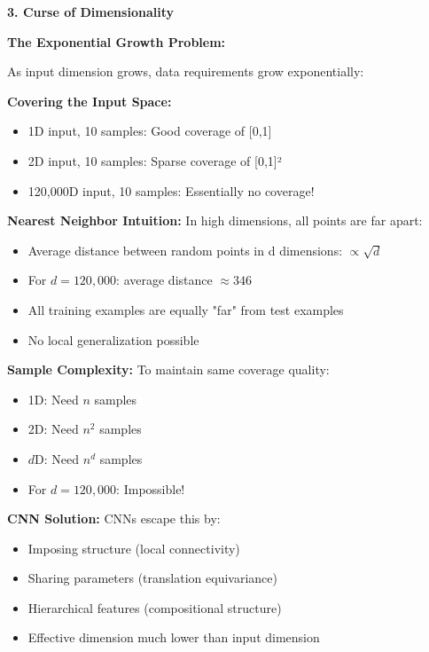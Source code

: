 \documentclass[12pt]{article}
\newcommand{\explanation}[1]{{\color{explanationcolor}#1}}
\begin{document}
\begin{enumerate}[(a)]
{    \textbf{3. Curse of Dimensionality}
    
    \explanation{
    \textbf{The Exponential Growth Problem:}
    
    As input dimension grows, data requirements grow exponentially:
    
    \textbf{Covering the Input Space:}
    \begin{itemize}
        \item 1D input, 10 samples: Good coverage of [0,1]
        \item 2D input, 10 samples: Sparse coverage of [0,1]²
        \item 120,000D input, 10 samples: Essentially no coverage!
    \end{itemize}
    
    \textbf{Nearest Neighbor Intuition:}
    In high dimensions, all points are far apart:
    \begin{itemize}
        \item Average distance between random points in d dimensions: $\propto \sqrt{d}$
        \item For $d = 120,000$: average distance $\approx 346$
        \item All training examples are equally "far" from test examples
        \item No local generalization possible
    \end{itemize}
    
    \textbf{Sample Complexity:}
    To maintain same coverage quality:
    \begin{itemize}
        \item 1D: Need $n$ samples
        \item 2D: Need $n^2$ samples
        \item $d$D: Need $n^d$ samples
        \item For $d = 120,000$: Impossible!
    \end{itemize}
    
    \textbf{CNN Solution:}
    CNNs escape this by:
    \begin{itemize}
        \item Imposing structure (local connectivity)
        \item Sharing parameters (translation equivariance)
        \item Hierarchical features (compositional structure)
        \item Effective dimension much lower than input dimension
    \end{itemize}
    }
    }
    

\end{enumerate}
\end{document}
